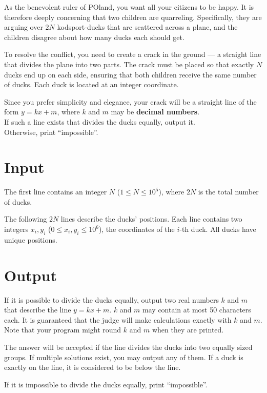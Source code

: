 \noindent

As the benevolent ruler of POland, you want all your citizens to be happy. 
It is therefore deeply concerning that two children are quarreling. 
Specifically, they are arguing over $2N$ kodsport-ducks that are scattered 
across a plane, and the children disagree about how many ducks each should get.

To resolve the conflict, you need to create a crack in the ground — a straight 
line that divides the plane into two parts. The crack must be placed so that 
exactly $N$ ducks end up on each side, ensuring that both children receive 
the same number of ducks. Each duck is located at an integer coordinate.

Since you prefer simplicity and elegance, your crack will be a straight line of
the form $y = kx + m$, where $k$ and $m$ may be \textbf{decimal numbers}.\\
If such a line exists that divides the ducks equally, output it.\\
Otherwise, print ``impossible''.

\section*{Input}
The first line contains an integer $N$ ($1 \leq N \leq 10^5$), where $2N$ is the total number of ducks.

The following $2N$ lines describe the ducks' positions. Each line contains two integers $x_i, y_i$
($0 \leq x_i, y_i \leq 10^6$), the coordinates of the $i$-th duck. All ducks have unique positions.

\section*{Output}
If it is possible to divide the ducks equally, output two real numbers $k$ and $m$ that describe the line $y = kx + m$.
$k$ and $m$ may contain at most 50 characters each. It is guaranteed that the judge will make calculations exactly
with $k$ and $m$. Note that your program might round $k$ and $m$ when they are printed.

The answer will be accepted if the line divides the ducks into two equally sized groups. If multiple solutions exist,
you may output any of them. If a duck is exactly on the line, it is considered to be below the line.

If it is impossible to divide the ducks equally, print ``impossible''.

